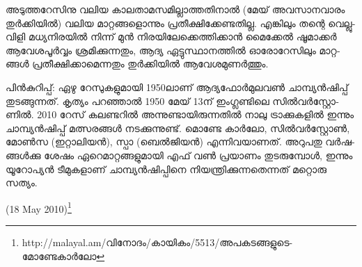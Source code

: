 അ­ടു­ത്ത­റേ­സി­നു വലിയ കാ­ല­താ­മ­സ­മി­ല്ലാ­ത്ത­തി­നാല്‍ (­മേ­യ് അവ­സാ­ന­വാ­രം തുര്‍­ക്കി­യില്‍) വലിയ മാ­റ്റ­ങ്ങ­ളൊ­ന്നും 
പ്ര­തീ­ക്ഷി­ക്കേ­ണ്ട­തി­ല്ല. എങ്കി­ലും തന്റെ വെ­ല്ലു­വി­ളി മധ്യ­നി­ര­യില്‍ നി­ന്ന് മുന്‍ നി­ര­യി­ലേ­ക്കെ­ത്തി­ക്കാന്‍ മൈ­ക്കേല്‍ ഷൂ­മാ­ക്കര്‍ 
ആവേ­ശ­പൂര്‍­വ്വം ശ്ര­മി­ക്കു­ന്ന­തും, ആദ്യ ഏട്ടു­സ്ഥാ­ന­ത്തില്‍ ഓരോ­റേ­സി­ലും മാ­റ്റ­ങ്ങള്‍ പ്ര­തീ­ക്ഷി­ക്കാ­മെ­ന്ന­തും തുര്‍­ക്കി­യില്‍ 
ആവേ­ശ­മു­ണര്‍­ത്തും.

­പിന്‍­കു­റി­പ്പ്: ഏഴു റേ­സു­ക­ളു­മാ­യി 1950­ലാ­ണ് ആദ്യ­ഫോര്‍­മു­ല­വണ്‍ ചാ­മ്പ്യന്‍­ഷി­പ്പ് തു­ട­ങ്ങു­ന്ന­ത്. കൃ­ത്യം പറ­ഞ്ഞാല്‍ 
1950 മേ­യ് 13­ന് ഇം­ഗ്ല­ണ്ടി­ലെ സില്‍­വര്‍­സ്റ്റോ­ണില്‍. 2010 റേ­സ് കല­ണ്ട­റില്‍ അന്നു­ണ്ടാ­യി­രു­ന്ന­തില്‍ നാ­ലു 
ട്രാ­ക്കു­ക­ളില്‍ ഇന്നും ചാ­മ്പ്യന്‍­ഷി­പ്പ് മത്സ­ര­ങ്ങള്‍ നട­ക്കു­ന്നു­ണ്ട്. മൊ­ണ്ടേ കാര്‍­ലോ, സില്‍­വര്‍­സ്റ്റോണ്‍, മോണ്‍­സ 
(ഇ­റ്റാ­ലി­യന്‍), സ്പാ ­(­ബെല്‍­ജി­യന്‍) എന്നി­വ­യാ­ണ­ത്. അറു­പ­തു വര്‍­ഷ­ങ്ങള്‍­ക്കു ശേ­ഷം ഏറെ­മാ­റ്റ­ങ്ങ­ളു­മാ­യി എഫ് 
വണ്‍ പ്ര­യാ­ണം തു­ട­രു­മ്പോള്‍, ഇന്നും യൂ­റോ­പ്യന്‍ ടീ­മു­ക­ളാ­ണ് ചാ­മ്പ്യന്‍­ഷി­പ്പി­നെ നി­യ­ന്ത്രി­ക്കു­ന്ന­തെ­ന്ന­ത് മറ്റൊ­രു 
സത്യം­.

(18 May 2010)\footnote{http://malayal.am/വിനോദം/കായികം/5513/അപകടങ്ങളുടെ-മോണ്ടേകാര്‍ലോ}

\newpage
